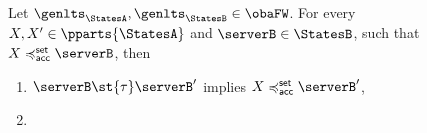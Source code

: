 \begin{lemma}
  \label{lem:bhvleqtwo-preserved}
  Let $\genlts_\StatesA, \genlts_\StatesB \in \obaFW$.
  For every
  $X, X' \in \pparts{ \StatesA }$ and $ \serverB \in \StatesB$,
  such that $X \accleqset \serverB$, then
  \begin{enumerate}
  \item\label{pt:bhvleqtwo-preserved-by-tau}
    $\serverB \st{ \tau } \serverB'$ implies $X \accleqset \serverB'$,
  \item\label{pt:bhvleqtwo-preserved-by-mu}
  \end{enumerate}
\end{lemma}





